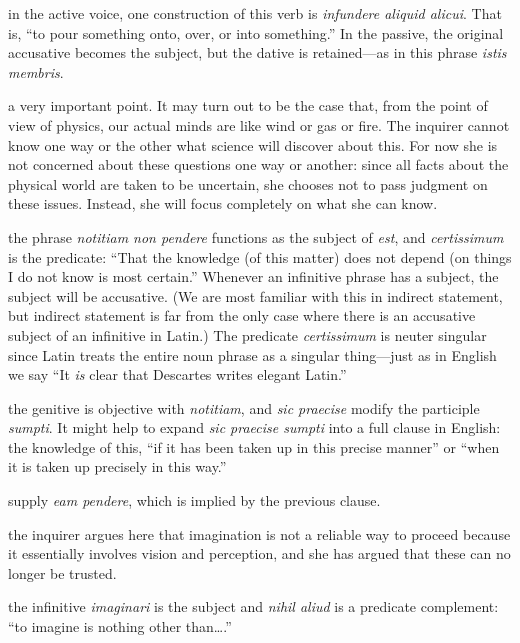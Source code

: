  in the active voice, one construction of this verb is \textit{infundere aliquid alicui}. That is, ``to pour something onto, over, or into something.'' In the passive, the original accusative becomes the subject, but the dative is retained---as in this phrase \textit{istis membris}.

 a very important point. It may turn out to be the case that, from the point of view of physics, our actual minds are like wind or gas or fire. The inquirer cannot know one way or the other what science will discover about this. For now she is not concerned about these questions one way or another: since all facts about the physical world are taken to be uncertain, she chooses not to pass judgment on these issues. Instead, she will focus completely on what she can know.

 the phrase \textit{notitiam non pendere} functions as the subject of \textit{est}, and \textit{certissimum} is the predicate: ``That the knowledge (of this matter) does not depend (on things I do not know is most certain.'' Whenever an infinitive phrase has a subject, the subject will be accusative. (We are most familiar with this in indirect statement, but indirect statement is far from the only case where there is an accusative subject of an infinitive in Latin.) The predicate \textit{certissimum} is neuter singular since Latin treats the entire noun phrase as a singular thing---just as in English we say ``It \textit{is} clear that Descartes writes elegant Latin.''

 the genitive is objective with \textit{notitiam}, and \textit{sic praecise} modify the participle \textit{sumpti}. It might help to expand \textit{sic praecise sumpti} into a full clause in English: the knowledge of this, ``if it has been taken up in this precise manner'' or ``when it is taken up precisely in this way.''

 supply \textit{eam pendere}, which is implied by the previous clause.

 the inquirer argues here that imagination is not a reliable way to proceed because it essentially involves vision and perception, and she has argued that these can no longer be trusted.

 the infinitive \textit{imaginari} is the subject and \textit{nihil aliud} is a predicate complement: ``to imagine is nothing other than\dots.''

